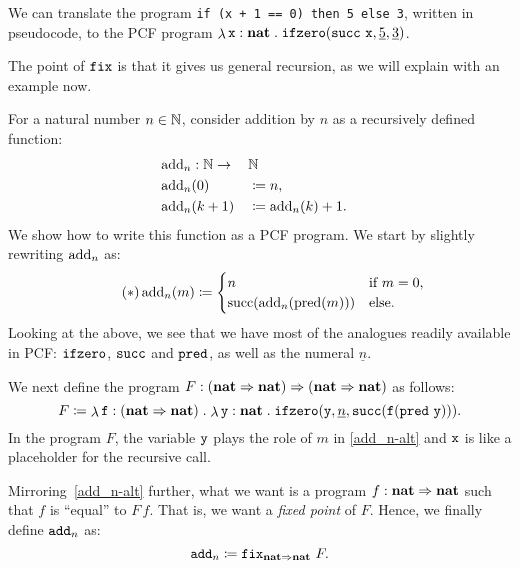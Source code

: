 \begin{example}\label{exam:ifzero}
  We can translate the program \verb|if (x + 1 == 0) then 5 else 3|, written in
  pseudocode, to the PCF program
  \(\lambdadot{\var x : \pcfnat}{\pcfifz(\pcfsuc \, \var x, \numeral 5, \numeral 3)}\).
\end{example}



The point of \(\pcffix\) is that it gives us general recursion, as we will
explain with an example now.

\begin{example}\label{exam:addition-by-n}
  For a natural number \(n \in \Nat\), consider addition by \(n\) as a
  recursively defined function:
  \begin{alignat*}{3}
    &\add_n : \Nat \to && \Nat && \\
    &\add_n(0) &&\coloneqq n, && \\
    &\add_n(k+1) &&\coloneqq \add_n(k) + 1. &&
  \end{alignat*}
  We show how to write this function as a PCF program. We start by slightly
  rewriting \(\add_n\) as:
  \begin{equation*}\label{add_n-alt}\tag{\(\ast\)}
    \add_n(m) \coloneqq
    \begin{cases}
      n &\text{if } m = 0, \\
      \suc\pa*{\add_n(\pred(m))} &\text{else}.
    \end{cases}
  \end{equation*}
  Looking at the above, we see that we have most of the analogues readily
  available in PCF: \(\pcfifz\), \(\pcfsuc\) and \(\pcfpred\), as well as the
  numeral \(\underline n\).

  We next define the program
  \(F : \pa*{\pcfnat \pcffun \pcfnat} \pcffun \pa*{\pcfnat \pcffun \pcfnat}\) as
  follows:
  \[
    F \coloneqq \lambdadot{\var f : \pa{\pcfnat \pcffun
        \pcfnat}}{\lambdadot{\var y : \pcfnat}%
      {\pcfifz\pa*{\var y,\numeral{n},%
          \pcfsuc\pa*{\var f\pa*{\pcfpred \, \var y }}}}}.
  \]
  In the program \(F\), the variable \(\var y\) plays the role of \(m\) in
  \eqref{add_n-alt} and \(\var x\) is like a placeholder for the recursive call.

  Mirroring~\eqref{add_n-alt} further, what we want is a program
  \(f : \pcfnat \pcffun \pcfnat\) such that \(f\) is ``equal'' to \(F\,f\). That
  is, we want a \emph{fixed point} of \(F\).
  Hence, we finally define \(\pcfadd_n\) as:
  \[
    \pcfadd_n \coloneqq \pcffix_{\pcfnat \pcffun \pcfnat} \, F.
  \]
\end{example}

